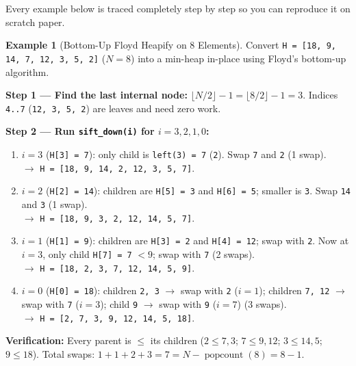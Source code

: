 \documentclass[11pt,a4paper]{article}
\theoremstyle{definition}
\newtheorem{example}{Example}[section]
\begin{document}
Every example below is traced completely step by step so you can reproduce it on scratch paper.

\begin{example}[Bottom-Up Floyd Heapify on 8 Elements]
Convert \texttt{H = [18, 9, 14, 7, 12, 3, 5, 2]} ($N = 8$) into a min-heap in-place using Floyd's bottom-up algorithm.

\textbf{Step 1 --- Find the last internal node:} $\lfloor N / 2 \rfloor - 1 = \lfloor 8 / 2 \rfloor - 1 = 3$. Indices \texttt{4..7} (\texttt{12, 3, 5, 2}) are leaves and need zero work.

\textbf{Step 2 --- Run \texttt{sift\_down(i)} for $i = 3, 2, 1, 0$:}
\begin{enumerate}[itemsep=1pt, topsep=2pt]
    \item $i = 3$ (\texttt{H[3] = 7}): only child is \texttt{left(3) = 7} (\texttt{2}). Swap \texttt{7} and \texttt{2} (1 swap).\\
    $\to$ \texttt{H = [18, 9, 14, 2, 12, 3, 5, 7]}.
    \item $i = 2$ (\texttt{H[2] = 14}): children are \texttt{H[5] = 3} and \texttt{H[6] = 5}; smaller is \texttt{3}. Swap \texttt{14} and \texttt{3} (1 swap).\\
    $\to$ \texttt{H = [18, 9, 3, 2, 12, 14, 5, 7]}.
    \item $i = 1$ (\texttt{H[1] = 9}): children are \texttt{H[3] = 2} and \texttt{H[4] = 12}; swap with \texttt{2}. Now at $i = 3$, only child \texttt{H[7] = 7} $< 9$; swap with \texttt{7} (2 swaps).\\
    $\to$ \texttt{H = [18, 2, 3, 7, 12, 14, 5, 9]}.
    \item $i = 0$ (\texttt{H[0] = 18}): children \texttt{2, 3} $\to$ swap with \texttt{2} ($i=1$); children \texttt{7, 12} $\to$ swap with \texttt{7} ($i=3$); child \texttt{9} $\to$ swap with \texttt{9} ($i=7$) (3 swaps).\\
    $\to$ \texttt{H = [2, 7, 3, 9, 12, 14, 5, 18]}.
\end{enumerate}

\textbf{Verification:} Every parent is $\le$ its children ($2 \le 7, 3$; $7 \le 9, 12$; $3 \le 14, 5$; $9 \le 18$). Total swaps: $1 + 1 + 2 + 3 = 7 = N - \operatorname{popcount}(8) = 8 - 1$.
\end{example}
\end{document}
